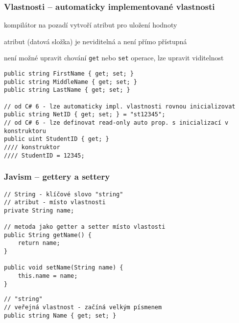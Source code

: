 \begin{frame}[fragile]
\frametitle{Vlastnosti -- automaticky implementované vlastnosti}
\vfill
\begin{bitemize}{}
\item kompilátor na pozadí vytvoří atribut pro uložení hodnoty
\item atribut (datová složka) je neviditelná a není přímo přístupná
\item není možné upravit chování \lstinline|get| nebo \lstinline|set| operace, lze upravit viditelnost
\end{bitemize}
\vfill
\begin{yesblock}
\begin{lstlisting}
public string FirstName { get; set; }
public string MiddleName { get; set; }
public string LastName { get; set; }

// od C# 6 - lze automaticky impl. vlastnosti rovnou inicializovat
public string NetID { get; set; } = "st12345";
// od C# 6 - lze definovat read-only auto prop. s inicializací v konstruktoru
public uint StudentID { get; }
//// konstruktor
//// StudentID = 12345;
\end{lstlisting}
\end{yesblock}
\vfill
\end{frame}




\begin{frame}[fragile]
\frametitle{Javism -- gettery a settery}
\vfill
\begin{noblock}
\begin{lstlisting}[basicstyle=\small]
// String - klíčové slovo "string"
// atribut - místo vlastnosti
private String name;

// metoda jako getter a setter místo vlastosti
public String getName() {
    return name;
}

public void setName(String name) {
    this.name = name;
}
\end{lstlisting}
\end{noblock}
\vfill
\begin{yesblock}
\begin{lstlisting}[basicstyle=\small]
// "string"
// veřejná vlastnost - začíná velkým písmenem
public string Name { get; set; }
\end{lstlisting}
\end{yesblock}
\vfill
\end{frame}


